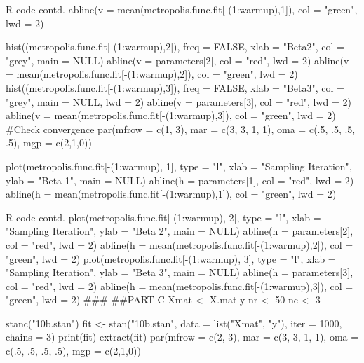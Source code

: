 \documentclass{article}
\begin{document}
\begin{sexylisting}{R code contd.}
abline(v = mean(metropolis.func.fit[-(1:warmup),1]), 
       col = "green",
       lwd = 2)

hist((metropolis.func.fit[-(1:warmup),2]), 
     freq = FALSE,
     xlab = "Beta2",
     col = "grey",
     main = NULL)
abline(v = parameters[2], 
       col = "red",
       lwd = 2)
abline(v = mean(metropolis.func.fit[-(1:warmup),2]), 
       col = "green",
       lwd = 2)
hist((metropolis.func.fit[-(1:warmup),3]), 
     freq = FALSE,
     xlab = "Beta3",
     col = "grey",
     main = NULL,
     lwd = 2)
abline(v = parameters[3], 
       col = "red",
       lwd = 2)
abline(v = mean(metropolis.func.fit[-(1:warmup),3]), 
       col = "green",
       lwd = 2)
#Check convergence
par(mfrow = c(1, 3), 
    mar = c(3, 3, 1, 1), 
    oma = c(.5, .5, .5, .5), 
    mgp = c(2,1,0))

plot(metropolis.func.fit[-(1:warmup), 1], 
     type = "l",
     xlab = "Sampling Iteration",
     ylab = "Beta 1",
     main = NULL)
abline(h = parameters[1], 
       col = "red",
       lwd = 2)
abline(h = mean(metropolis.func.fit[-(1:warmup),1]), 
       col = "green",
       lwd = 2)
       \end{sexylisting}
\begin{sexylisting}{R code contd.}
plot(metropolis.func.fit[-(1:warmup), 2], 
     type = "l",
     xlab = "Sampling Iteration",
     ylab = "Beta 2",
     main = NULL)
abline(h = parameters[2], 
       col = "red",
       lwd = 2)
abline(h = mean(metropolis.func.fit[-(1:warmup),2]), 
       col = "green",
       lwd = 2)
plot(metropolis.func.fit[-(1:warmup), 3], 
     type = "l",
     xlab = "Sampling Iteration",
     ylab = "Beta 3",
     main = NULL)
abline(h = parameters[3], 
       col = "red",
       lwd = 2)
abline(h = mean(metropolis.func.fit[-(1:warmup),3]), 
       col = "green",
       lwd = 2)
###
##PART C
Xmat <- X.mat
y
nr <- 50
nc <- 3

stanc("10b.stan")
fit <- stan("10b.stan", 
            data = list("Xmat", "y"),
            iter = 1000,
            chains = 3)
print(fit)
extract(fit)
par(mfrow = c(2, 3), 
    mar = c(3, 3, 1, 1), 
    oma = c(.5, .5, .5, .5), 
    mgp = c(2,1,0))
    \end{sexylisting}
\end{document}
